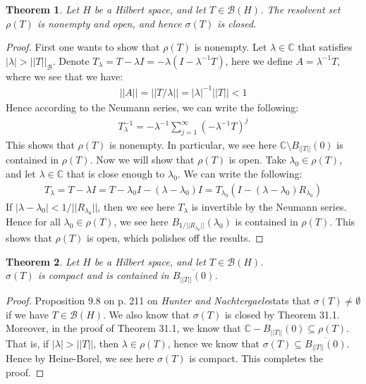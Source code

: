 \documentclass[11pt]{book}
\theoremstyle{break}
\theoremstyle{break}
\newtheorem{thm}{Theorem}[section]
\newcommand{\C}{\mathbb{C}}
\newcommand{\txt}{\textit{Hunter and Nachtergaele}}
\begin{document}
\begin{thm}
Let $H$ be a Hilbert space, and let $T \in \mathcal{B}(H)$. The resolvent set $\rho(T)$ is nonempty and open, and hence $\sigma(T)$ is closed. 
\end{thm}
\begin{proof}
First one wants to show that $\rho(T)$ is nonempty. Let $\lambda \in \C$ that satisfies $|\lambda| > ||T||_{\mathcal{B}}$. Denote $T_{\lambda} = T- \lambda I = -\lambda(I - \lambda^{-1}T)$, here we define $A = \lambda^{-1}T$, where we see that we have:
\begin{align*}
||A|| = ||T/\lambda|| = |\lambda|^{-1} ||T||< 1
\end{align*} 
Hence according to the Neumann series, we can write the following:
\begin{align*}
T^{-1}_{\lambda} = -\lambda^{-1}\sum_{j=1}^\infty (-\lambda^{-1}T)^j
\end{align*}
This shows that $\rho(T)$ is nonempty. In particular, we see here $\C \setminus B_{||T||}(0)$ is contained in $\rho(T)$. Now we will show that $\rho(T)$ is open. Take $\lambda_0 \in \rho(T)$, and let $\lambda \in \C$ that is close enough to $\lambda_0$. We can write the following:
\begin{align*}
T_{\lambda} = T-\lambda I = T-\lambda_0 I - (\lambda - \lambda_0)I = T_{\lambda_0}(I - (\lambda - \lambda_0)R_{\lambda_0})
\end{align*}
If $|\lambda - \lambda_0|< 1/||R_{\lambda_0}||$, then we see here $T_{\lambda}$ is invertible by the Neumann series. Hence for all $\lambda_0 \in \rho(T)$, we see here $B_{1/||R_{\lambda_0}||}(\lambda_0)$ is contained in $\rho(T)$. This shows that $\rho(T)$ is open, which polishes off the results. 
\end{proof}


\begin{thm}
Let $H$ be a Hilbert space, and let $T \in \mathcal{B}(H)$. \\
$\sigma(T)$ is compact and is contained in $\overline{B_{||T||}(0)}$. 
\end{thm}
\begin{proof}
Proposition 9.8 on p. 211 on \txt stats that $\sigma(T) \neq \emptyset$ if we have $T \in \mathcal{B}(H)$. We also know that $\sigma(T)$ is closed by Theorem 31.1. Moreover, in the proof of Theorem 31.1, we know that $\C -B_{||T||}(0) \subseteq \rho(T)$. That is, if $|\lambda| > ||T||$, then $\lambda \in \rho(T)$, hence we know that $\sigma(T) \subseteq \overline{B_{||T||}(0)}$. Hence by Heine-Borel, we see here $\sigma(T)$ is compact. This completes the proof. 
\end{proof}
\end{document}
